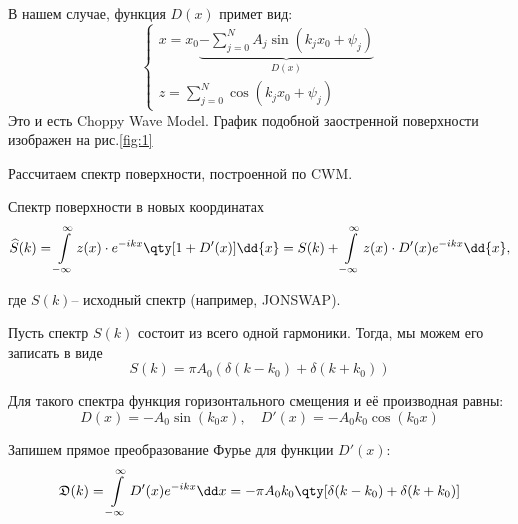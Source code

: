 В нашем случае, функция $D(x)$ примет вид: 
\begin{equation}
    \begin{cases}
    x = x_{0} \underbrace{
    - \sum\limits_{j=0}^{N} A_j \sin(k_j x_0 + \psi_j)
    }_{D(x)} \\
        z = \sum\limits_{j=0}^{N} \cos(k_j x_{0} + \psi_j)
    \end{cases}
\end{equation}
Это и есть Choppy Wave Model. График подобной заостренной поверхности 
изображен на рис.\ref{fig:1}


Рассчитаем спектр  поверхности, построенной по CWM.

 Спектр поверхности в новых координатах 
 \begin{equation}
     \label{eq:S_cwm}
     \widehat S(k) = \int\limits_{-\infty}^{\infty} z(x) \cdot  
     e^{-ikx} \qty[ 1 + D'(x)]
     \dd{x}  = S(k) + \int\limits_{-\infty}^{\infty} z(x) \cdot D'(x)  
     e^{-ikx}\dd{x},
 \end{equation}

 где $S(k)$-- исходный спектр (например, JONSWAP).

 Пусть спектр $S(k)$ состоит из всего одной гармоники. Тогда, мы можем его
 записать в виде
 \begin{equation}
     S(k) = \pi A_{0}( \delta(k-k_{0}) + \delta(k+k_{0}))
 \end{equation}

 Для такого спектра функция горизонтального смещения и её производная равны:
 \begin{equation}
     D(x) = -A_{0} \sin(k_{0} x), \quad
     D'(x) = -A_{0} k_{0} \cos(k_{0} x)
 \end{equation}

 Запишем прямое преобразование Фурье для функции $D'(x)$:
 \newcommand{\D}{\mathfrak{D}}
  \begin{equation}
     \D(k) = \int\limits_{-\infty}^{\infty} D'(x) e^{-ikx} \dd x =
     - \pi A_{0}k_{0}\qty[\delta(k-k_{0})+\delta(k+k_{0})]
 \end{equation}

